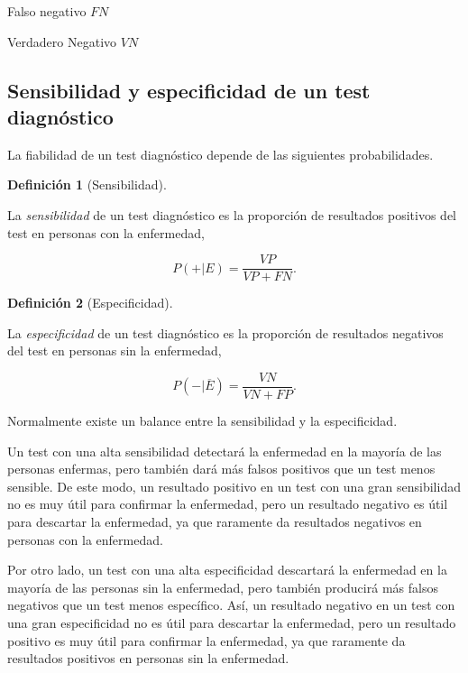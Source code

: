 \documentclass[
  a4paper,
]{scrreport}
\theoremstyle{plain}
\theoremstyle{definition}
\theoremstyle{definition}
\newtheorem{definition}{Definición}[chapter]
\theoremstyle{remark}
\begin{document}
{Falso negativo }\(FN\)

{Verdadero Negativo }\(VN\)

\subsection{Sensibilidad y especificidad de un test
diagnóstico}\label{sensibilidad-y-especificidad-de-un-test-diagnuxf3stico}

La fiabilidad de un test diagnóstico depende de las siguientes
probabilidades.

\begin{definition}[Sensibilidad]\protect\hypertarget{def-sensibilidad}{}\label{def-sensibilidad}

La \emph{sensibilidad} de un test diagnóstico es la proporción de
resultados positivos del test en personas con la enfermedad,

\[P(+|E)=\frac{VP}{VP+FN}.\]

\end{definition}

\begin{definition}[Especificidad]\protect\hypertarget{def-especificidad}{}\label{def-especificidad}

La \emph{especificidad} de un test diagnóstico es la proporción de
resultados negativos del test en personas sin la enfermedad,

\[P(-|\overline{E})=\frac{VN}{VN+FP}.\]

\end{definition}

Normalmente existe un balance entre la sensibilidad y la especificidad.

Un test con una alta sensibilidad detectará la enfermedad en la mayoría
de las personas enfermas, pero también dará más falsos positivos que un
test menos sensible. De este modo, un resultado positivo en un test con
una gran sensibilidad no es muy útil para confirmar la enfermedad, pero
un resultado negativo es útil para descartar la enfermedad, ya que
raramente da resultados negativos en personas con la enfermedad.

Por otro lado, un test con una alta especificidad descartará la
enfermedad en la mayoría de las personas sin la enfermedad, pero también
producirá más falsos negativos que un test menos específico. Así, un
resultado negativo en un test con una gran especificidad no es útil para
descartar la enfermedad, pero un resultado positivo es muy útil para
confirmar la enfermedad, ya que raramente da resultados positivos en
personas sin la enfermedad.
\end{document}
